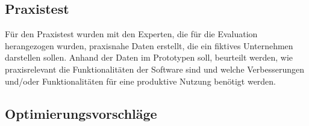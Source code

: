 \subsection{Praxistest}
Für den Praxistest wurden mit den Experten, die für die Evaluation herangezogen wurden, praxisnahe Daten erstellt, die ein fiktives Unternehmen darstellen sollen. Anhand der Daten im Prototypen soll, beurteilt werden, wie praxisrelevant die Funktionalitäten der Software sind und welche Verbesserungen und/oder Funktionalitäten für eine produktive Nutzung benötigt werden.

\subsection{Optimierungsvorschläge}
